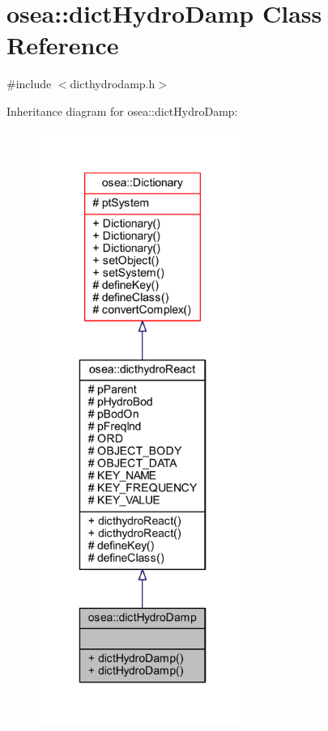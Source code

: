 \hypertarget{classosea_1_1dict_hydro_damp}{\section{osea\-:\-:dict\-Hydro\-Damp Class Reference}
\label{classosea_1_1dict_hydro_damp}
}


{\ttfamily \#include $<$dicthydrodamp.\-h$>$}



Inheritance diagram for osea\-:\-:dict\-Hydro\-Damp\-:
\nopagebreak
\begin{figure}[H]
\begin{center}
\leavevmode
\includegraphics[height=550pt]{classosea_1_1dict_hydro_damp__inherit__graph}
\end{center}
\end{figure}
